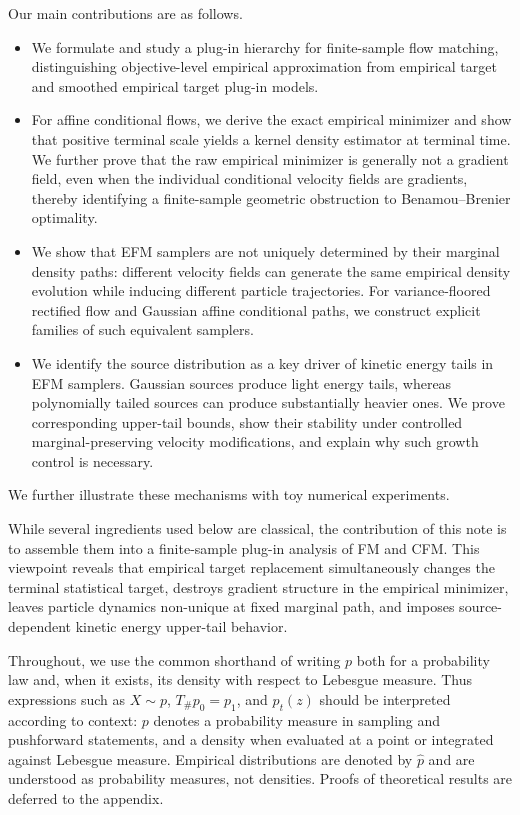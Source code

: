 \documentclass[a4paper,11pt]{article}
\theoremstyle{plain}
\theoremstyle{definition}
\begin{document}
Our main contributions are as follows.
\begin{itemize}[leftmargin=2em]
    \item We formulate and study a plug-in hierarchy for finite-sample flow matching, distinguishing objective-level empirical approximation from empirical target and smoothed empirical target plug-in models.
    \item For affine conditional flows, we derive the exact empirical minimizer and show that positive terminal scale yields a kernel density estimator at terminal time. We further prove that the raw empirical minimizer is generally not a gradient field, even when the individual conditional velocity fields are gradients, thereby identifying a finite-sample geometric obstruction to Benamou--Brenier optimality.
    \item We show that EFM samplers are not uniquely determined by their marginal
    density paths: different velocity fields can generate the same empirical density
    evolution while inducing different particle trajectories. For variance-floored
    rectified flow and Gaussian affine conditional paths, we construct explicit
    families of such equivalent samplers.
    \item We identify the source distribution as a key driver of kinetic energy
tails in EFM samplers. Gaussian sources produce light energy tails, whereas
polynomially tailed sources can produce substantially heavier ones. We prove
corresponding upper-tail bounds, show their stability under controlled
marginal-preserving velocity modifications, and explain why such growth control
is necessary. 
\end{itemize}
We further illustrate these mechanisms with toy numerical experiments.

While several ingredients used below are classical, the contribution of this note is to assemble them into a finite-sample plug-in analysis of FM and CFM. This viewpoint reveals that empirical target replacement simultaneously changes the terminal statistical target, destroys gradient structure in the empirical minimizer, leaves particle dynamics non-unique at fixed marginal path, and imposes source-dependent kinetic energy upper-tail behavior.


Throughout, we use the common shorthand of writing \(p\) both for a probability law and,
when it exists, its density with respect to Lebesgue measure. Thus expressions such as
\(X\sim p\), \(T_{\#}p_0=p_1\), and \(p_t(z)\) should be interpreted according to context:
\(p\) denotes a probability measure in sampling and pushforward statements, and a density
when evaluated at a point or integrated against Lebesgue measure. Empirical distributions are
denoted by \(\hat p\) and are understood as probability measures, not densities.
Proofs of theoretical results are deferred to the appendix.
\end{document}
